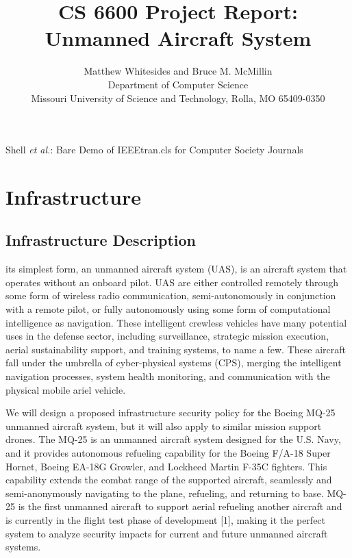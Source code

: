 \documentclass[10pt,journal,compsoc]{IEEEtran}
\begin{document}
\title{CS 6600 Project Report: Unmanned Aircraft System}

\author{Matthew Whitesides and Bruce M. McMillin \\
Department of Computer Science \\
Missouri University of Science and Technology, Rolla, MO 65409-0350}

%
{Shell \MakeLowercase{\textit{et al.}}: Bare Demo of IEEEtran.cls for Computer Society Journals}


\maketitle

\IEEEpeerreviewmaketitle


\section{Infrastructure}

\subsection{Infrastructure Description}

 its simplest form, an unmanned aircraft system (UAS), is an aircraft system that operates without an onboard pilot. 
UAS are either controlled remotely through some form of wireless radio communication, semi-autonomously in conjunction with a remote pilot, or fully autonomously using some form of computational intelligence as navigation. 
These intelligent crewless vehicles have many potential uses in the defense sector, including surveillance, strategic mission execution, aerial sustainability support, and training systems, to name a few. 
These aircraft fall under the umbrella of cyber-physical systems (CPS), merging the intelligent navigation processes, system health monitoring, and communication with the physical mobile ariel vehicle.

We will design a proposed infrastructure security policy for the Boeing MQ-25 unmanned aircraft system, but it will also apply to similar mission support drones. 
The MQ-25 is an unmanned aircraft system designed for the U.S. Navy, and it provides autonomous refueling capability for the Boeing F/A-18 Super Hornet, Boeing EA-18G Growler, and Lockheed Martin F-35C fighters.
This capability extends the combat range of the supported aircraft, seamlessly and semi-anonymously navigating to the plane, refueling, and returning to base. 
MQ-25 is the first unmanned aircraft to support aerial refueling another aircraft and is currently in the flight test phase of development [1], making it the perfect system to analyze security impacts for current and future unmanned aircraft systems. 
\end{document}
